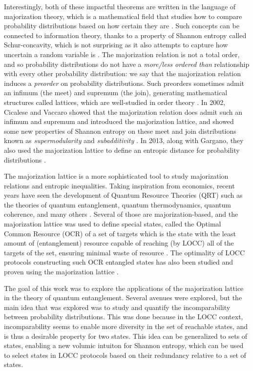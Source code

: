 Interestingly, both of these impactful theorems are written in the language of majorization theory, which is a mathematical field that studies how to compare probability distributions based on how certain they are \cite{marshall_inequalities_2011}. Such concepts can be connected to information theory, thanks to a property of Shannon entropy called Schur-concavity, which is not surprising as it also attempts to capture how uncertain a random variable is \cite{marshall_inequalities_2011, cover_elements_2006}. The majorization relation is not a total order, and so probability distributions do not have a \textit{more/less ordered than} relationship with every other probability distribution: we say that the majorization relation induces a \textit{preorder} on probability distributions. Such preorders sometimes admit an infimum (the meet) and supremum (the join), generating mathematical structures called lattices, which are well-studied in order theory \cite{davey_introduction_2002}. In 2002, Cicalese and Vaccaro showed that the majorization relation does admit such an infimum and supremum and introduced the majorization lattice, and showed some new properties of Shannon entropy on these meet and join distributions known as \textit{supermodularity} and \textit{subadditivity} \cite{cicalese_supermodularity_2002}. In 2013, along with Gargano, they also used the majorization lattice to define an entropic distance for probability distributions \cite{cicalese_information_2013}.

The majorization lattice is a more sophisticated tool to study majorization relations and entropic inequalities. Taking inspiration from economics, recent years have seen the development of Quantum Resource Theories (QRT) such as the theories of quantum entanglement, quantum thermodynamics, quantum coherence, and many others \cite{chitambar_quantum_2019}. Several of those are majorization-based, and the majorization lattice was used to define special states, called the Optimal Common Resource (OCR) of a set of targets which is the state with the least amount of (entanglement) resource capable of reaching (by LOCC) all of the targets of the set, ensuring minimal waste of resource \cite{bosyk_optimal_2019}. The optimality of LOCC protocols constructing such OCR entangled states has also been studied and proven using the majorization lattice \cite{deside_probabilistic_2024}.

The goal of this work was to explore the applications of the majorization lattice in the theory of quantum entanglement. Several avenues were explored, but the main idea that was explored was to study and quantify the incomparability between probability distributions. This was done because in the LOCC context, incomparability seems to enable more diversity in the set of reachable states, and is thus a desirable property for two states. This idea can be generalized to sets of states, enabling a new volumic intuiton for Shannon entropy, which can be used to select states in LOCC protocols based on their redundancy relative to a set of states.

